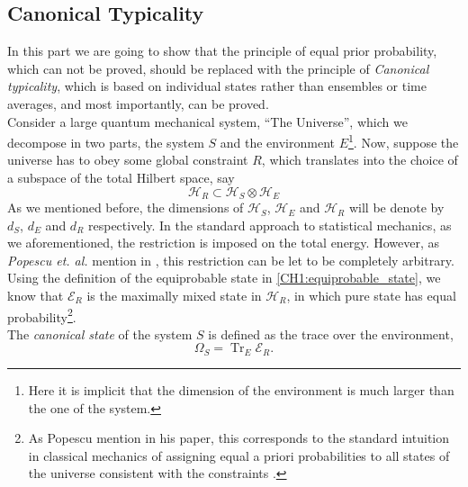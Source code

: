 \subsection{Canonical Typicality}
In this part we are going to show that the principle of equal prior probability, which can not be proved, should be replaced with the principle of \textit{Canonical typicality}, which is based on individual states rather than ensembles or time averages, and most importantly, can be proved.\\

\indent Consider a large quantum mechanical system, ``The Universe'', which we decompose in two parts, the system $S$ and the environment $E$\footnote{Here it is implicit that the dimension of the environment is much larger than the one of the system.}. Now, suppose the universe has to obey some global constraint $R$, which translates into the choice of a subspace of the total Hilbert space, say
 \begin{equation}
 \mathcal{H}_{R} \subset \mathcal{H}_{S} \otimes \mathcal{H}_{E}
 \label{CH1:Tipicality_1}
 \end{equation}
\indent As we mentioned before, the dimensions of $\mathcal{H}_{S}$, $\mathcal{H}_{E}$  and $\mathcal{H}_{R}$ will be denote by $d_S$, $d_E$ and $d_R$ respectively. In the standard approach to statistical mechanics, as we aforementioned, the restriction is imposed on the total energy. However, as \textit{Popescu et. al.} mention in \cite{popescu_entanglement_2006,popescu_foundations_2005}, this restriction can be let to be completely arbitrary.\\

\indent Using the definition of the equiprobable state in \eqref{CH1:equiprobable_state}, we know that $\mathcal{E}_R$ is the maximally mixed state in $\mathcal{H}_R$, in which pure state has equal probability\footnote{As Popescu mention in his paper, this corresponds to the standard intuition in classical mechanics of assigning equal a priori probabilities to all states of the universe consistent with the constraints \cite{popescu_entanglement_2006,popescu_foundations_2005}.}.\\

\indent The \textit{canonical state} of the system $S$ is defined as the trace over the environment,
\begin{equation}
\Omega_{S}=\operatorname{Tr}_{E} \mathcal{E}_{R}.
\label{CH1:Canonical_state}
\end{equation}

